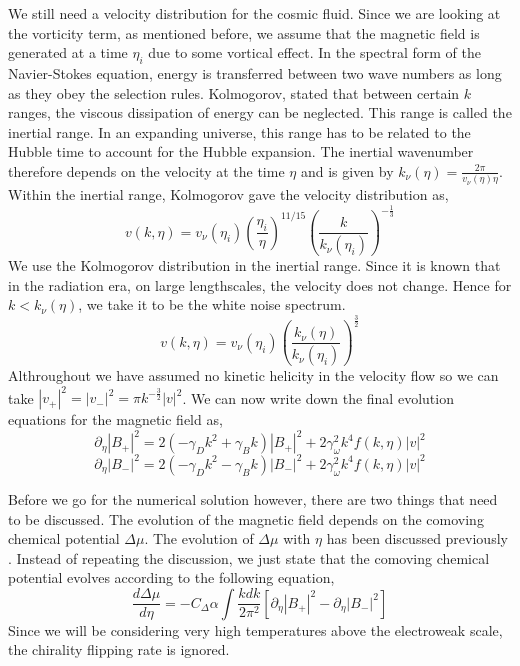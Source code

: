 \documentclass{ws-mpla}
\begin{document}
We still need a velocity distribution for the cosmic fluid. Since we are looking at the vorticity term, as mentioned before,
we assume that the magnetic field is generated at a time $\eta_i$ due to some vortical effect. In the spectral form of the Navier-Stokes equation, energy is transferred between 
two wave numbers as long as they obey the selection rules. Kolmogorov, stated that between certain $k$ ranges, the viscous dissipation of energy can be neglected.
This range is called the inertial range. In an expanding universe, this range has to be related to the Hubble time to account for the Hubble expansion. The inertial 
wavenumber therefore depends on the velocity at the time $\eta$ and is given by $k_{\nu} (\eta) = \frac{2 \pi}{v_{\nu} (\eta) \eta}$. Within the inertial range, 
Kolmogorov gave the velocity distribution as, 
\begin{equation}
	v(k, \eta) = v_{\nu} (\eta_i) \left(\frac{\eta_i}{\eta}\right)^{11/15} \left(\frac{k}{k_{\nu}(\eta_i)}\right)^{-\frac{1}{3}}
\end{equation}
We use the Kolmogorov distribution in the inertial range. Since it is known that in the radiation era, on large lengthscales, the velocity does not change. Hence 
for $k< k_{\nu} (\eta)$, we take it to be the white noise spectrum.
\begin{equation}
	v(k, \eta) = v_{\nu} (\eta_i)  \left(\frac{k_{\nu}(\eta)}{k_{\nu}(\eta_i)}\right)^{\frac{3}{2}}
\end{equation}
Althroughout we have assumed no kinetic helicity in the velocity flow so we can take $|v_{+}|^2 = |v_{-}|^2 = \pi k^{-\frac{3}{2}}|v|^2 $. We can now write down the final evolution equations for the magnetic field as, 
\begin{equation}
\label{final1}
 \partial_\eta |B_{+}|^2 = 2(-\gamma_D k^2 + \gamma_B k)|B_{+}|^2 + 2\gamma_{\omega}^2 k^4 f(k,\eta) |v|^2
\end{equation}
\begin{equation}
\label{final2}
 \partial_\eta |B_{-}|^2 = 2(-\gamma_D k^2 - \gamma_B k)|B_{-}|^2 + 2\gamma_{\omega}^2 k^4 f(k,\eta) |v|^2
\end{equation}

Before we go for the numerical solution however, there are two things that need to be discussed. The evolution of the magnetic field depends on the comoving chemical potential 
$\Delta \mu$. The evolution of $\Delta \mu$ with $\eta$ has been discussed previously \cite{joyce,tashiro}. Instead of repeating the discussion, we just state that the comoving chemical potential 
evolves according to the following equation, 
\begin{equation}
\label{final3}
 \frac{d\Delta \mu}{d \eta} = - C_{\Delta} \alpha \int \frac{k dk}{2 \pi^2} [\partial_\eta |B_{+}|^2 - \partial_\eta |B_{-}|^2 ]
\end{equation}
Since we will be considering very high temperatures above the electroweak scale, the chirality flipping rate is ignored.   
\end{document}
